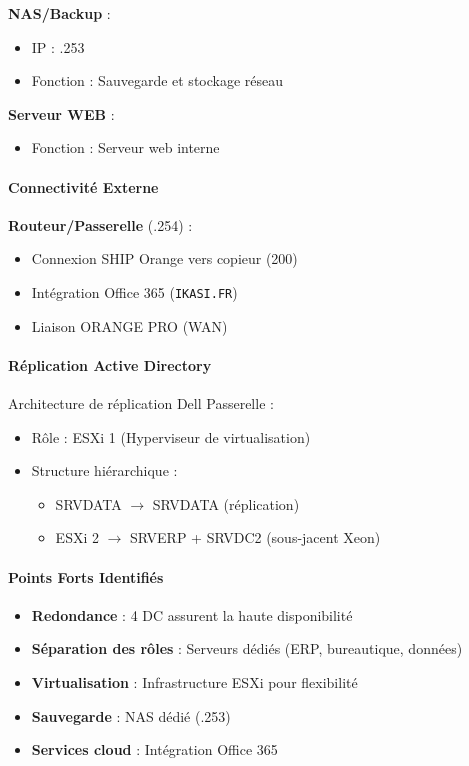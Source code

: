 \noindent \textbf{NAS/Backup} :
\begin{itemize}
	\item IP : .253
	\item Fonction : Sauvegarde et stockage réseau
\end{itemize}

\noindent \textbf{Serveur WEB} :
\begin{itemize}
	\item Fonction : Serveur web interne
\end{itemize}

\paragraph{Connectivité Externe}
\noindent \textbf{Routeur/Passerelle} (.254) :
\begin{itemize}
	\item Connexion SHIP Orange vers copieur (200)
	\item Intégration Office 365 (\texttt{IKASI.FR})
	\item Liaison ORANGE PRO (WAN)
\end{itemize}

\paragraph{Réplication Active Directory}
\noindent Architecture de réplication Dell Passerelle :
\begin{itemize}
	\item Rôle : ESXi 1 (Hyperviseur de virtualisation)
	\item Structure hiérarchique :
	\begin{itemize}
		\item SRVDATA $\rightarrow$ SRVDATA (réplication)
		\item ESXi 2 $\rightarrow$ SRVERP + SRVDC2 (sous-jacent Xeon)
	\end{itemize}
\end{itemize}

\paragraph{Points Forts Identifiés}
\begin{itemize}
	\item[\checkmark] \textbf{Redondance} : 4 DC assurent la haute disponibilité
	\item[\checkmark] \textbf{Séparation des rôles} : Serveurs dédiés (ERP, bureautique, données)
	\item[\checkmark] \textbf{Virtualisation} : Infrastructure ESXi pour flexibilité
	\item[\checkmark] \textbf{Sauvegarde} : NAS dédié (.253)
	\item[\checkmark] \textbf{Services cloud} : Intégration Office 365
\end{itemize}

